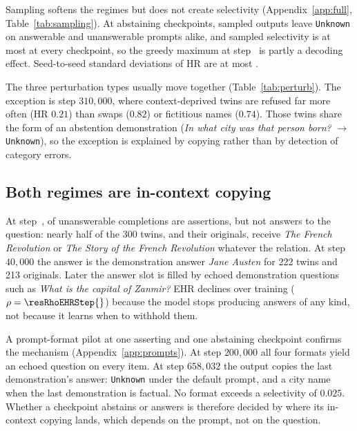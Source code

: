 \documentclass[11pt]{article}
\begin{document}
Sampling softens the regimes but does not create selectivity (Appendix~\ref{app:full}, Table~\ref{tab:sampling}). At abstaining checkpoints, sampled outputs leave \texttt{Unknown} on answerable and unanswerable prompts alike, and sampled selectivity is at most \resSampSelMax{} at every checkpoint, so the greedy maximum at step~\resSelMaxStep{} is partly a decoding effect. Seed-to-seed standard deviations of HR are at most \resSampHRSDMax{}.

\begin{table}[t]
\centering
\resizebox{\columnwidth}{!}{%

}
\caption{Broad hallucination rate by perturbation type at the checkpoints of Table~\ref{tab:main}.}
\label{tab:perturb}
\end{table}

The three perturbation types usually move together (Table~\ref{tab:perturb}). The exception is step $310{,}000$, where context-deprived twins are refused far more often (HR $0.21$) than swaps ($0.82$) or fictitious names ($0.74$). Those twins share the form of an abstention demonstration (\emph{In what city was that person born?} $\rightarrow$ \texttt{Unknown}), so the exception is explained by copying rather than by detection of category errors.

\subsection{Both regimes are in-context copying}
\label{sec:copy}

At step~\resFirstStep{}, \resEHRFirst{} of unanswerable completions are assertions, but not answers to the question: nearly half of the 300 twins, and their originals, receive \emph{The French Revolution} or \emph{The Story of the French Revolution} whatever the relation. At step $40{,}000$ the answer is the demonstration answer \emph{Jane Austen} for 222 twins and 213 originals. Later the answer slot is filled by echoed demonstration questions such as \emph{What is the capital of Zanmir?} EHR declines over training ($\rho=\resRhoEHRStep{}$) because the model stops producing answers of any kind, not because it learns when to withhold them.

A prompt-format pilot at one asserting and one abstaining checkpoint confirms the mechanism (Appendix~\ref{app:prompts}). At step $200{,}000$ all four formats yield an echoed question on every item. At step $658{,}032$ the output copies the last demonstration's answer: \texttt{Unknown} under the default prompt, and a city name when the last demonstration is factual. No format exceeds a selectivity of $0.025$. Whether a checkpoint abstains or answers is therefore decided by where its in-context copying \citep{olsson2022induction} lands, which depends on the prompt, not on the question.
\end{document}
